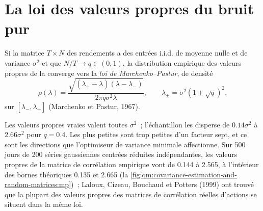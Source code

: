 \begin{omfigure}

\label{fig:qm:covariance-estimation-and-random-matrices:bias}
\end{omfigure}

\section{La loi des valeurs propres du bruit pur}

\begin{theorem}\label{thm:qm:covariance-estimation-and-random-matrices:mp}
Si la matrice $T \times N$ des rendements a des entrées i.i.d. de moyenne nulle et de variance $\sigma^2$ et que $N/T \to q \in (0, 1)$, la distribution empirique des valeurs propres de
la  converge vers la \emph{loi de Marchenko--Pastur}, de densité
\[
\rho(\lambda) = \frac{\sqrt{(\lambda_+ - \lambda)(\lambda - \lambda_-)}}{2\pi q\sigma^2\lambda}, \qquad \lambda_\pm = \sigma^2(1 \pm \sqrt q)^2,
\]
sur $[\lambda_-, \lambda_+]$ (Marchenko et Pastur, 1967).
\end{theorem}

Les valeurs propres vraies valent toutes $\sigma^2$~; l'échantillon les disperse de $0.14\sigma^2$ à $2.66\sigma^2$ pour $q = 0.4$. Les plus petites sont trop petites d'un facteur sept, et ce sont
les directions que l'optimiseur de variance minimale affectionne. Sur 500 jours de 200 séries gaussiennes centrées réduites indépendantes, les valeurs propres de la matrice de corrélation empirique vont de 0.144 à 2.565,
à l'intérieur des bornes théoriques 0.135 et 2.665 (la \cref{fig:qm:covariance-estimation-and-random-matrices:mp})~; Laloux, Cizeau, Bouchaud et Potters (1999) ont trouvé que la plupart des
valeurs propres des matrices de corrélation réelles d'actions se situent dans la même loi.

